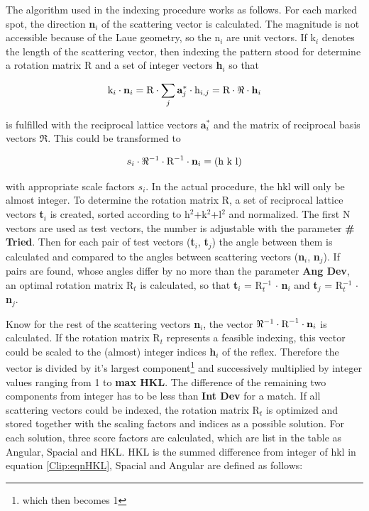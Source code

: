 The algorithm used in the indexing procedure works as follows.  For
each marked spot, the direction \textbf{n}$_i$ of the scattering
vector is calculated. The magnitude is not accessible because of the
Laue geometry, so the n$_i$ are unit vectors. If k$_i$ denotes the
length of the scattering vector, then indexing the pattern stood for
determine a rotation matrix R and a set of integer vectors
\textbf{h}$_i$ so that

\begin{displaymath}
\textnormal{k}_i \cdot \mathbf{n}_i = \textnormal{R} \cdot \sum_j \mathbf{a}^*_j
\cdot \textnormal{h}_{i,j} = \textnormal{R} \cdot \Re \cdot \mathbf{h}_i
\end{displaymath}

is fulfilled with the reciprocal lattice vectors $\mathbf{a}^*_i$ and
the matrix of reciprocal basis vectors $\Re$.  This could be
transformed to

\begin{equation}
s_i \cdot \Re^{-1} \cdot \textnormal{R}^{-1} \cdot \mathbf{n}_i
= (\textnormal{h k l})
\label{Clip:eqnHKL}
\end{equation}

with appropriate scale factors $s_i$. In the actual procedure, the hkl
will only be almost integer.  To determine the rotation matrix R, a
set of reciprocal lattice vectors \textbf{t}$_i$ is created, sorted
according to h$^2$+k$^2$+l$^2$ and normalized. The first N vectors are
used as test vectors, the number is adjustable with the parameter
\textbf{\# Tried}.  Then for each pair of test vectors
(\textbf{t}$_i$, \textbf{t}$_j$) the angle between them is calculated
and compared to the angles between scattering vectors (\textbf{n}$_i$,
\textbf{n}$_j$). If pairs are found, whose angles differ by no more
than the parameter \textbf{Ang Dev}, an optimal rotation matrix R$_t$
is calculated, so that \textbf{t}$_i$ = R$_t^{-1}$ $\cdot$
\textbf{n}$_i$ and \textbf{t}$_j$ = R$_t^{-1}$ $\cdot$ \textbf{n}$_j$.

Know for the rest of the scattering vectors \textbf{n}$_i$, the vector
$\Re^{-1} \cdot \textnormal{R}^{-1} \cdot \mathbf{n}_i$ is calculated.
If the rotation matrix R$_t$ represents a feasible indexing, this
vector could be scaled to the (almost) integer indices \textbf{h}$_i$
of the reflex. Therefore the vector is divided by it's largest
component\footnote{which then becomes 1} and successively multiplied
by integer values ranging from 1 to \textbf{max HKL}. The difference
of the remaining two components from integer has to be less than
\textbf{Int Dev} for a match. If all scattering vectors could be
indexed, the rotation matrix R$_t$ is optimized and stored together
with the scaling factors and indices as a possible solution. For each
solution, three score factors are calculated, which are list in the
table as Angular, Spacial and HKL.  HKL is the summed difference from
integer of hkl in equation \ref{Clip:eqnHKL}, Spacial and Angular are
defined as follows:

